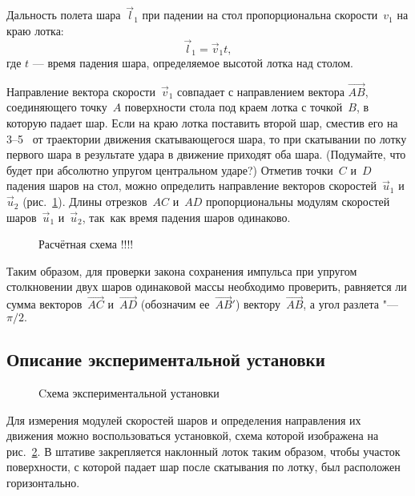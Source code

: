 \documentclass[a4paper, 12pt]{extarticle}
\begin{document}
Дальность полета шара~$\vec l_1$ при падении на стол пропорциональна скорости~$v_1$ на краю лотка:
\[
\vec l_1 = \vec v_1 t,
\]
где $t$ --- время падения шара, определяемое высотой лотка над столом.

Направление вектора скорости~$\vec v_1$ совпадает с направлением вектора $\vec{AB}$, соединяющего точку~$A$ поверхности стола под краем лотка с точкой~$B$, в которую падает шар. Если на краю лотка поставить второй шар, сместив его на 3--5~ от траектории движения скатывающегося шара, то при скатывании по лотку первого шара в результате удара в движение приходят оба шара. (Подумайте, что будет при абсолютно упругом центральном ударе?) Отметив точки~$C$ и~$D$ падения шаров на стол, можно определить направление векторов скоростей~$\vec u_1$ и~$\vec u_2$ (рис.~\ref{fig:m4-impulse-diagram}). Длины отрезков~$AC$ и~$AD$ пропорциональны модулям скоростей шаров~$\vec u_1$ и~$\vec u_2$, так~как время падения шаров одинаково. %

\begin{figure}[b]
\begin{center}
\end{center}
\caption{Расчётная схема \Huge !!!!\label{fig:m4-impulse-diagram}}
\end{figure}

Таким образом, для проверки закона сохранения импульса при упругом столкновении двух шаров одинаковой массы необходимо проверить, равняется ли сумма векторов~$\vec{AC}$ и~$\vec{AD}$ (обозначим ее~$\vec{AB}'$) вектору~$\vec{AB}$, а угол разлета "--- $\pi/2.$

\subsection{Описание экспериментальной установки}

\begin{figure}[b]
\begin{center}
\end{center}
\caption{Cхема экспериментальной установки \label{fig:m4-equipment}}
\end{figure} %

Для измерения модулей скоростей шаров и определения направления их движения можно воспользоваться установкой, схема которой изображена на рис.~\ref{fig:m4-equipment}. В штативе закрепляется наклонный лоток таким образом, чтобы участок поверхности, с которой падает шар после скатывания по лотку, был расположен горизонтально. %
\end{document}
